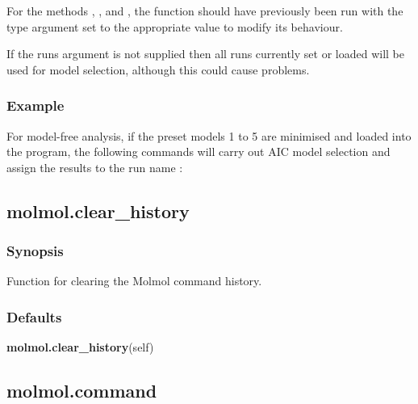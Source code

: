 For the methods 
, 
, and 
, the function 
 should have
previously been run with the type argument set to the appropriate value to modify its
behaviour.

If the runs argument is not supplied then all runs currently set or loaded will be used for
model selection, although this could cause problems.


\subsubsection{Example}

For model-free analysis, if the preset models 1 to 5 are minimised and loaded into the
program, the following commands will carry out AIC model selection and assign the results
to the run name 
:







\newpage

\subsection{molmol.clear\_history}


\subsubsection{Synopsis}

Function for clearing the Molmol command history.

\subsubsection{Defaults}

\textsf{\textbf{molmol.clear\_history}(self)}



\newpage

\subsection{molmol.command}


